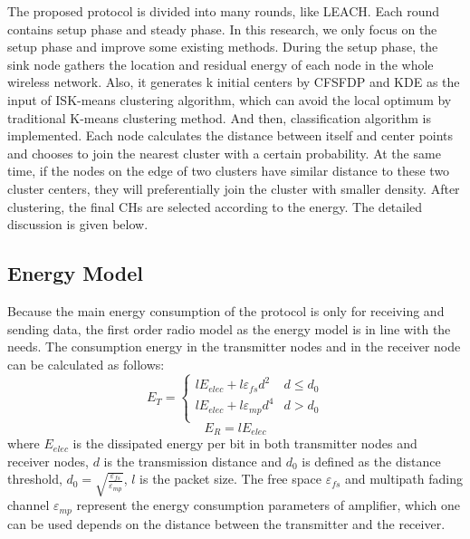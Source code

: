 \documentclass[journal,twoside,web]{ieeecolor}
\begin{document}
The proposed protocol is divided into many rounds, like LEACH. Each round contains setup phase and steady phase. In this research, we only focus on the setup phase and improve some existing methods. During the setup phase,  the sink node gathers the location and residual energy of each node in the whole wireless network. Also, it generates k initial centers by CFSFDP and KDE as the input of ISK-means clustering algorithm, which can avoid the local optimum by traditional K-means clustering method. And then, classification algorithm is implemented. Each node calculates the distance between itself and center points and chooses to join the nearest cluster with a certain probability. At the same time, if the nodes on the edge of two clusters have similar distance to these two cluster centers, they will preferentially join the cluster with smaller density. After clustering, the final CHs are selected according to the energy. The detailed discussion is given below.
\subsection{Energy Model}
Because the main energy consumption of the protocol is only for receiving and sending data, the first order radio model as the energy model is in line with the needs. The consumption energy in the transmitter nodes and in the receiver node can be calculated as follows:
\begin{equation}
E_{T}=\left\{ \begin{array}{ll}
lE_{elec} + l\varepsilon_{fs}d^2 & d \leq d_0 \\
lE_{elec} + l\varepsilon_{mp}d^4 & d > d_0 \\
\end{array} \right.
\end{equation}
\begin{equation}
E_R = lE_{elec}
\end{equation}
where $E_{elec}$ is the dissipated energy per bit in both transmitter nodes and receiver nodes, $d$ is the transmission distance and $d_0$ is defined as the distance threshold, $d_0 = \sqrt{\frac{\varepsilon_{fs}}{\varepsilon_{mp}}}$, $l$ is the packet size. The free space $\varepsilon_{fs}$ and multipath fading channel $\varepsilon_{mp}$ represent the energy consumption parameters of amplifier, which one can be used depends on the distance between the transmitter and the receiver. 
\end{document}
